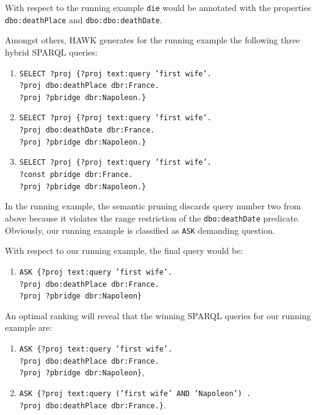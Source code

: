 With respect to the running example \texttt{die} would be annotated with the properties \texttt{dbo:deathPlace} and \texttt{dbo:dbo:deathDate}.

Amongst others, HAWK generates for the running example the following three hybrid SPARQL queries:
\begin{enumerate}
\item \texttt{SELECT ?proj  \{?proj text:query 'first wife'.\\ ?proj dbo:deathPlace dbr:France.\\ ?proj ?pbridge dbr:Napoleon.\}}
\item \texttt{SELECT ?proj  \{?proj text:query 'first wife'.\\ ?proj dbo:deathDate dbr:France.\\ ?proj ?pbridge dbr:Napoleon.\}}
\item \texttt{SELECT ?proj  \{?proj text:query 'first wife'.\\ ?const pbridge dbr:France.\\ ?proj ?pbridge dbr:Napoleon.\}}
\end{enumerate}


In the running example, the semantic pruning discards query number two from above because it violates the range restriction of the \texttt{dbo:deathDate} predicate.
Obviously, our running example is classified as \texttt{ASK} demanding question.

With respect to our running example, the final query would be: 
\begin{enumerate}
\item \texttt{ASK \{?proj text:query 'first wife'.\\ ?proj dbo:deathPlace dbr:France.\\ ?proj ?pbridge dbr:Napoleon\}}
\end{enumerate}

An optimal ranking will reveal that the winning SPARQL queries for our running example are:
\begin{enumerate}
\item \texttt{ASK \{?proj text:query 'first wife'. \\?proj dbo:deathPlace dbr:France. \\?proj ?pbridge dbr:Napoleon\}}, 
\item \texttt{ASK \{?proj text:query ('first wife' AND 'Napoleon') .\\ ?proj dbo:deathPlace dbr:France.\}}.
\end{enumerate} 